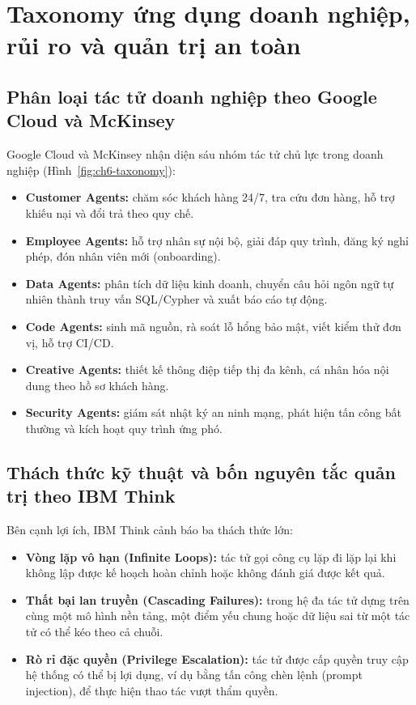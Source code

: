 \chapter{Taxonomy ứng dụng doanh nghiệp, rủi ro và quản trị an toàn}\label{ch:quantri}

\section{Phân loại tác tử doanh nghiệp theo Google Cloud và McKinsey}
Google Cloud \cite{google_agents} và McKinsey \cite{mckinsey_agents} nhận diện sáu nhóm tác tử chủ lực trong doanh
nghiệp (Hình~\ref{fig:ch6-taxonomy}):
\begin{itemize}
  \item \textbf{Customer Agents:} chăm sóc khách hàng 24/7, tra cứu đơn hàng, hỗ trợ khiếu nại và đổi trả theo quy chế.
  \item \textbf{Employee Agents:} hỗ trợ nhân sự nội bộ, giải đáp quy trình, đăng ký nghỉ phép, đón nhân viên mới
        (onboarding).
  \item \textbf{Data Agents:} phân tích dữ liệu kinh doanh, chuyển câu hỏi ngôn ngữ tự nhiên thành truy vấn SQL/Cypher và
        xuất báo cáo tự động.
  \item \textbf{Code Agents:} sinh mã nguồn, rà soát lỗ hổng bảo mật, viết kiểm thử đơn vị, hỗ trợ CI/CD.
  \item \textbf{Creative Agents:} thiết kế thông điệp tiếp thị đa kênh, cá nhân hóa nội dung theo hồ sơ khách hàng.
  \item \textbf{Security Agents:} giám sát nhật ký an ninh mạng, phát hiện tấn công bất thường và kích hoạt quy trình ứng
        phó.
\end{itemize}


\section{Thách thức kỹ thuật và bốn nguyên tắc quản trị theo IBM Think}
Bên cạnh lợi ích, IBM Think \cite{ibm_agents} cảnh báo ba thách thức lớn:
\begin{itemize}
  \item \textbf{Vòng lặp vô hạn (Infinite Loops):} tác tử gọi công cụ lặp đi lặp lại khi không lập được kế hoạch hoàn
        chỉnh hoặc không đánh giá được kết quả.
  \item \textbf{Thất bại lan truyền (Cascading Failures):} trong hệ đa tác tử dựng trên cùng một mô hình nền tảng, một
        điểm yếu chung hoặc dữ liệu sai từ một tác tử có thể kéo theo cả chuỗi.
  \item \textbf{Rò rỉ đặc quyền (Privilege Escalation):} tác tử được cấp quyền truy cập hệ thống có thể bị lợi dụng, ví dụ
        bằng tấn công chèn lệnh (prompt injection), để thực hiện thao tác vượt thẩm quyền.
\end{itemize}

